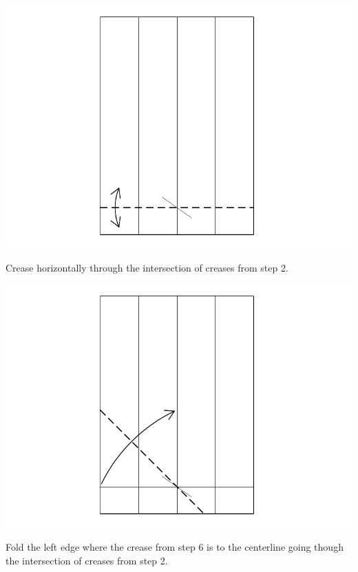\documentclass[11pt]{article}
\begin{document}
\begin{minipage}[t]{0.45\textwidth}
  \includegraphics[width=\textwidth]{../figs/fig04-04}
  \begin{itemize}{\item[4.] Crease horizontally through the intersection of creases from step 2.}\end{itemize}
\end{minipage}
\hfill
\begin{minipage}[t]{0.45\textwidth}
  \includegraphics[width=\textwidth]{../figs/fig04-05}
  \begin{itemize}{\item[5.] Fold the left edge where the crease from step 6 is to the centerline going though the intersection of creases from step 2.}\end{itemize}
\end{minipage}
\end{document}
